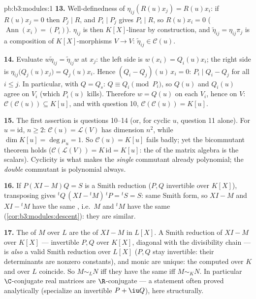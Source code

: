 \begin{solution}{pb:b3:modules:1}
\textbf{13.} Well-definedness of $\eta_{ij}(R(u)x_j) = R(u)x_i$:
if $R(u)x_j = 0$ then $P_j \mid R$, and $P_i \mid P_j$ gives
$P_i \mid R$, so $R(u)x_i = 0$ ($\operatorname{Ann}(x_i) =
(P_i)$). $\eta_{ij}$ is then $K[X]$-linear by construction, and
$\tilde\eta_{ij} = \eta_{ij}\pi_j$ is a composition of
$K[X]$-morphisms $V \to V$: $\tilde\eta_{ij} \in \mathcal
C(u)$.

\textbf{14.} Evaluate $w\tilde\eta_{ij} = \tilde\eta_{ij}w$ at
$x_j$: the left side is $w(x_i) = Q_i(u)x_i$; the right side is
$\eta_{ij}\bigl(Q_j(u)x_j\bigr) = Q_j(u)x_i$. Hence $(Q_i -
Q_j)(u)\,x_i = 0$: $P_i \mid Q_i - Q_j$ for all $i \leq j$. In
particular, with $Q = Q_s$: $Q \equiv Q_i \pmod{P_i}$, so $Q(u)$
and $Q_i(u)$ agree on $V_i$ (which $P_i(u)$ kills). Therefore $w
= Q(u)$ on each $V_i$, hence on $V$: $\mathcal C(\mathcal C(u))
\subseteq K[u]$, and with question 10, $\mathcal C(\mathcal
C(u)) = K[u]$.

\textbf{15.} The first assertion is questions 10--14 (or, for
cyclic $u$, question 11 alone). For $u = \mathrm{id}$, $n \geq
2$: $\mathcal C(u) = \mathcal L(V)$ has dimension $n^2$, while
$\dim K[u] = \deg\mu_u = 1$. So $\mathcal C(u) = K[u]$ fails
badly; yet the bicommutant theorem
holds ($\mathcal C(\mathcal L(V)) = K\,\mathrm{id} = K[u]$: the
 of the matrix algebra is the scalars). Cyclicity is what
makes the \emph{single} commutant already polynomial; the
\emph{double} commutant is polynomial always.

\textbf{16.} If $P(XI - M)Q = S$ is a Smith reduction ($P, Q$
invertible over $K[X]$), transposing gives ${}^tQ\,(XI -
{}^tM)\,{}^tP = {}^tS = S$: same Smith form, so $XI - M$ and
$XI - {}^tM$ have the same , i.e.\ $M$ and
${}^tM$ have the same 
(\cref{cor:b3:modules:descent}): they are similar.

\textbf{17.} The  of $M$ over $L$ are the
 of $XI - M$ in $L[X]$. A Smith reduction of
$XI - M$ over $K[X]$ --- invertible $P, Q$ over $K[X]$,
diagonal with the divisibility chain --- is \emph{also} a valid
Smith reduction over $L[X]$ ($P, Q$ stay invertible: their
determinants are nonzero constants), and monic  are unique: the  computed over $K$ and
over $L$ coincide. So $M \sim_L N$ iff they have the same
 iff $M \sim_K N$. In particular
$\C$-conjugate real matrices are $\R$-conjugate --- a statement
often proved analytically (specialize an invertible $P + \iu
Q$), here structurally.


\end{solution}
